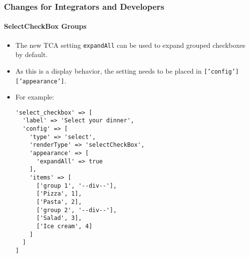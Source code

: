 %

\begin{frame}[fragile]
	\frametitle{Changes for Integrators and Developers}
	\framesubtitle{SelectCheckBox Groups}

	\lstset{basicstyle=\tiny\ttfamily}

	\begin{itemize}
		\item The new TCA setting \texttt{expandAll} can be used to expand
			grouped checkboxes by default.
		\item As this is a display behavior, the setting needs to be placed
		 	in \texttt{['config']['appearance']}.
		\item For example:
\begin{lstlisting}
'select_checkbox' => [
  'label' => 'Select your dinner',
  'config' => [
    'type' => 'select',
    'renderType' => 'selectCheckBox',
    'appearance' => [
      'expandAll' => true
    ],
    'items' => [
      ['group 1', '--div--'],
      ['Pizza', 1],
      ['Pasta', 2],
      ['group 2', '--div--'],
      ['Salad', 3],
      ['Ice cream', 4]
    ]
  ]
]
\end{lstlisting}

	\end{itemize}

\end{frame}

